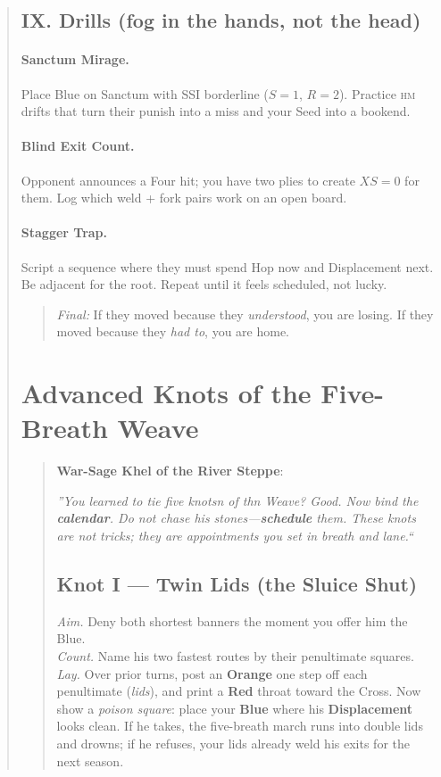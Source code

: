 \documentclass[11pt]{article}
\begin{document}
\begin{quote}
\subsection{IX. Drills (fog in the hands, not the head)}
\paragraph{Sanctum Mirage.} Place Blue on Sanctum with SSI borderline ($S{=}1$, $R{=}2$). Practice \textsc{hm} drifts that turn their punish into a miss and your Seed into a bookend.
\paragraph{Blind Exit Count.} Opponent announces a Four hit; you have two plies to create $XS=0$ for them. Log which weld + fork pairs work on an open board.
\paragraph{Stagger Trap.} Script a sequence where they must spend Hop now and Displacement next. Be adjacent for the root. Repeat until it feels scheduled, not lucky.

\begin{quote}\small
\emph{Final:} If they moved because they \emph{understood}, you are losing. If they moved because they \emph{had to}, you are home.
\end{quote}

\clearpage
\section{Advanced Knots of the Five-Breath Weave}
\label{sec:advanced-weave}

\begin{quote}\small
\textbf{War-Sage Khel of the River Steppe}:

\medskip
\emph{''You learned to tie five knotsn of thn Weave? Good. Now bind the \textbf{calendar}. Do not chase his stones---\textbf{schedule} them. These knots are not tricks; they are appointments you set in breath and lane.``}

\subsection*{Knot I --- Twin Lids (the Sluice Shut)}
\emph{Aim.} Deny both shortest banners the moment you offer him the Blue.\\
\emph{Count.} Name his two fastest routes by their penultimate squares.\\
\emph{Lay.} Over prior turns, post an \textbf{Orange} one step off each penultimate (\emph{lids}), and print a \textbf{Red} throat toward the Cross. Now show a \emph{poison square}: place your \textbf{Blue} where his \textbf{Displacement} looks clean. If he takes, the five-breath march runs into double lids and drowns; if he refuses, your lids already weld his exits for the next season.


\end{quote}
\end{quote}
\end{document}

